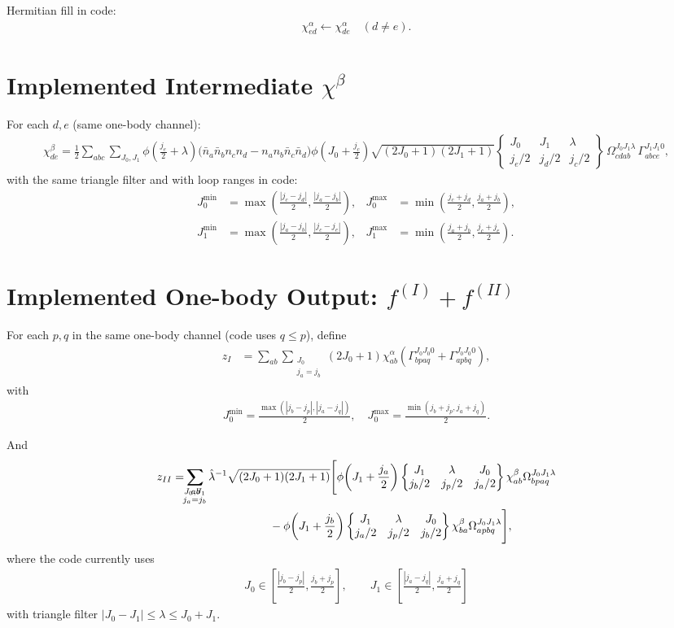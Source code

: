 \documentclass{article}
\newcommand{\sixj}[6]{\left\{\begin{matrix}#1&#2&#3\\#4&#5&#6\end{matrix}\right\}}
\begin{document}
Hermitian fill in code:
\begin{align}
\chi^{\alpha}_{ed} \leftarrow \chi^{\alpha}_{de}\quad (d\ne e).
\end{align}

\section*{Implemented Intermediate $\chi^\beta$}
For each $d,e$ (same one-body channel):
\begin{align}
\chi^{\beta}_{de}
= \frac{1}{2}
\sum_{abc}
\sum_{J_0,J_1}
\phi\!\left(\frac{j_e}{2}+\lambda\right)
\Big(
\bar n_a\bar n_b n_c n_d - n_a n_b \bar n_c \bar n_d
\Big)
\phi\!\left(J_0+\frac{j_c}{2}\right)
\sqrt{(2J_0+1)(2J_1+1)}
\sixj{J_0}{J_1}{\lambda}{j_e/2}{j_d/2}{j_c/2}
\,\Omega^{J_0J_1\lambda}_{cdab}
\,\Gamma^{J_1J_1 0}_{abce},
\end{align}
with the same triangle filter and with loop ranges in code:
\begin{align}
J_0^{\min} &= \max\!\left(\frac{|j_c-j_d|}{2},\frac{|j_a-j_b|}{2}\right),
&
J_0^{\max} &= \min\!\left(\frac{j_c+j_d}{2},\frac{j_a+j_b}{2}\right),\\
J_1^{\min} &= \max\!\left(\frac{|j_a-j_b|}{2},\frac{|j_c-j_e|}{2}\right),
&
J_1^{\max} &= \min\!\left(\frac{j_a+j_b}{2},\frac{j_c+j_e}{2}\right).
\end{align}

\section*{Implemented One-body Output: $f^{(I)}+f^{(II)}$}
For each $p,q$ in the same one-body channel (code uses $q\le p$), define
\begin{align}
z_I &=
\sum_{ab}\!\!\!\!\!\!\!\!\!\!\!\!
\sum_{\substack{J_0\\ j_a=j_b}}
(2J_0+1)
\chi^{\alpha}_{ab}
\left(
\Gamma^{J_0J_0 0}_{bpaq} + \Gamma^{J_0J_0 0}_{apbq}
\right),
\end{align}
with
\begin{align}
J_0^{\min} = \frac{\max(|j_b-j_p|,|j_a-j_q|)}{2},
\quad
J_0^{\max} = \frac{\min(j_b+j_p,j_a+j_q)}{2}.
\end{align}

And
\begin{align}
z_{II} &= \sum_{ab}\!\!\!\!\!\!\!\!\!\!\!\!
\sum_{\substack{J_0,J_1\\ j_a=j_b}}
\hat\lambda^{-1}\sqrt{(2J_0+1)(2J_1+1)}
\Bigg[
\phi\!\left(J_1+\frac{j_a}{2}\right)
\sixj{J_1}{\lambda}{J_0}{j_b/2}{j_p/2}{j_a/2}
\chi^{\beta}_{ab}
\Omega^{J_0J_1\lambda}_{bpaq}
\\
&\hspace{3.0cm}
-
\phi\!\left(J_1+\frac{j_b}{2}\right)
\sixj{J_1}{\lambda}{J_0}{j_a/2}{j_p/2}{j_b/2}
\chi^{\beta}_{ba}
\Omega^{J_0J_1\lambda}_{apbq}
\Bigg],
\end{align}
where the code currently uses
\begin{align}
J_0\in\left[\frac{|j_b-j_p|}{2},\frac{j_b+j_p}{2}\right],\qquad
J_1\in\left[\frac{|j_a-j_q|}{2},\frac{j_a+j_q}{2}\right]
\end{align}
with triangle filter $|J_0-J_1|\le\lambda\le J_0+J_1$.
\end{document}
